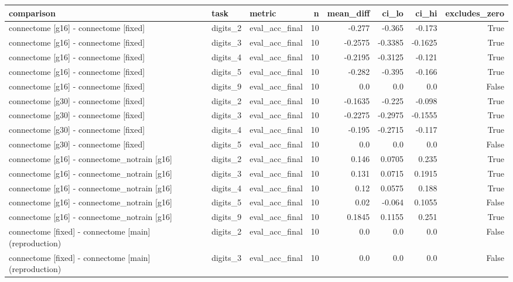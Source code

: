 \begin{table}[t]
\centering
\small
\begin{tabular}{lllrrrrr}
\toprule
comparison & task & metric & n & mean\_diff & ci\_lo & ci\_hi & excludes\_zero \\
\midrule
connectome [g16] - connectome [fixed] & digits\_2 & eval\_acc\_final & 10 & -0.277 & -0.365 & -0.173 & True \\
connectome [g16] - connectome [fixed] & digits\_3 & eval\_acc\_final & 10 & -0.2575 & -0.3385 & -0.1625 & True \\
connectome [g16] - connectome [fixed] & digits\_4 & eval\_acc\_final & 10 & -0.2195 & -0.3125 & -0.121 & True \\
connectome [g16] - connectome [fixed] & digits\_5 & eval\_acc\_final & 10 & -0.282 & -0.395 & -0.166 & True \\
connectome [g16] - connectome [fixed] & digits\_9 & eval\_acc\_final & 10 & 0.0 & 0.0 & 0.0 & False \\
connectome [g30] - connectome [fixed] & digits\_2 & eval\_acc\_final & 10 & -0.1635 & -0.225 & -0.098 & True \\
connectome [g30] - connectome [fixed] & digits\_3 & eval\_acc\_final & 10 & -0.2275 & -0.2975 & -0.1555 & True \\
connectome [g30] - connectome [fixed] & digits\_4 & eval\_acc\_final & 10 & -0.195 & -0.2715 & -0.117 & True \\
connectome [g30] - connectome [fixed] & digits\_5 & eval\_acc\_final & 10 & 0.0 & 0.0 & 0.0 & False \\
connectome [g16] - connectome\_notrain [g16] & digits\_2 & eval\_acc\_final & 10 & 0.146 & 0.0705 & 0.235 & True \\
connectome [g16] - connectome\_notrain [g16] & digits\_3 & eval\_acc\_final & 10 & 0.131 & 0.0715 & 0.1915 & True \\
connectome [g16] - connectome\_notrain [g16] & digits\_4 & eval\_acc\_final & 10 & 0.12 & 0.0575 & 0.188 & True \\
connectome [g16] - connectome\_notrain [g16] & digits\_5 & eval\_acc\_final & 10 & 0.02 & -0.064 & 0.1055 & False \\
connectome [g16] - connectome\_notrain [g16] & digits\_9 & eval\_acc\_final & 10 & 0.1845 & 0.1155 & 0.251 & True \\
connectome [fixed] - connectome [main] (reproduction) & digits\_2 & eval\_acc\_final & 10 & 0.0 & 0.0 & 0.0 & False \\
connectome [fixed] - connectome [main] (reproduction) & digits\_3 & eval\_acc\_final & 10 & 0.0 & 0.0 & 0.0 & False \\

\end{tabular}
\end{table}
